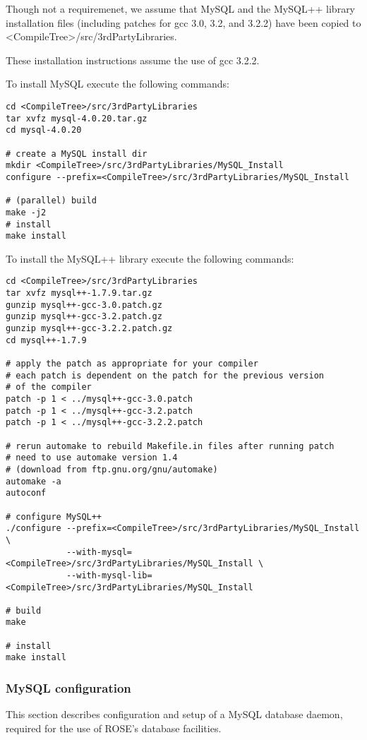 \documentclass[times, 10pt]{book}
\begin{document}
Though not a requiremenet, we assume that MySQL and the MySQL++ library
installation files (including patches for gcc 3.0, 3.2, and 3.2.2) have been
copied to \textless{}CompileTree\textgreater{}/src/3rdPartyLibraries.  

These installation instructions assume the use of gcc 3.2.2.

To install MySQL execute the following commands:

\begin{verbatim}
cd <CompileTree>/src/3rdPartyLibraries
tar xvfz mysql-4.0.20.tar.gz
cd mysql-4.0.20

# create a MySQL install dir
mkdir <CompileTree>/src/3rdPartyLibraries/MySQL_Install
configure --prefix=<CompileTree>/src/3rdPartyLibraries/MySQL_Install

# (parallel) build
make -j2
# install
make install
\end{verbatim}

To install the MySQL++ library execute the following commands:

\begin{verbatim}
cd <CompileTree>/src/3rdPartyLibraries
tar xvfz mysql++-1.7.9.tar.gz
gunzip mysql++-gcc-3.0.patch.gz
gunzip mysql++-gcc-3.2.patch.gz
gunzip mysql++-gcc-3.2.2.patch.gz
cd mysql++-1.7.9

# apply the patch as appropriate for your compiler
# each patch is dependent on the patch for the previous version 
# of the compiler
patch -p 1 < ../mysql++-gcc-3.0.patch
patch -p 1 < ../mysql++-gcc-3.2.patch
patch -p 1 < ../mysql++-gcc-3.2.2.patch

# rerun automake to rebuild Makefile.in files after running patch
# need to use automake version 1.4 
# (download from ftp.gnu.org/gnu/automake)
automake -a
autoconf

# configure MySQL++
./configure --prefix=<CompileTree>/src/3rdPartyLibraries/MySQL_Install \
            --with-mysql=<CompileTree>/src/3rdPartyLibraries/MySQL_Install \
            --with-mysql-lib=<CompileTree>/src/3rdPartyLibraries/MySQL_Install

# build
make

# install
make install
\end{verbatim}

\subsubsection{MySQL configuration}

This section describes configuration and setup of a MySQL database daemon,
required for the use of ROSE's database facilities.
\end{document}
